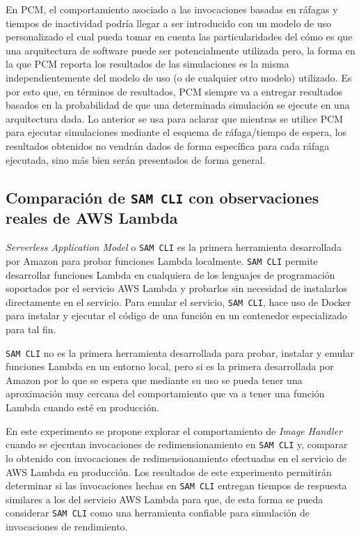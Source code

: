 En PCM, el comportamiento asociado a las invocaciones basadas en ráfagas y tiempos de inactividad podría llegar a ser introducido con un modelo de uso personalizado el cual pueda tomar en cuenta las particularidades del cómo es que una arquitectura de software puede ser potencialmente utilizada pero, la forma en la que PCM reporta los resultados de las simulaciones es la misma independientemente del modelo de uso (o de cualquier otro modelo) utilizado. Es por esto que, en términos de resultados, PCM siempre va a entregar resultados basados en la probabilidad de que una determinada simulación se ejecute en una arquitectura dada. Lo anterior se usa para aclarar que mientras se utilice PCM para ejecutar simulaciones mediante el esquema de ráfaga/tiempo de espera, los resultados obtenidos no vendrán dados de forma específica para cada ráfaga ejecutada, sino más bien serán presentados de forma general.

\subsection{Comparación de \texttt{SAM CLI} con observaciones reales de AWS Lambda}\label{sec:experimento-4} 
\emph{Serverless Application Model} o \texttt{SAM CLI} es la primera herramienta desarrollada por Amazon para probar funciones Lambda localmente. \texttt{SAM CLI} permite desarrollar funciones Lambda en cualquiera de los lenguajes de programación soportados por el servicio AWS Lambda y probarlos sin necesidad de instalarlos directamente en el servicio. Para emular el servicio, \texttt{SAM CLI}, hace uso de Docker para instalar y ejecutar el código de una función en un contenedor especializado para tal fin. 

\texttt{SAM CLI} no es la primera herramienta desarrollada para probar, instalar y emular funciones Lambda en un entorno local, pero si es la primera desarrollada por Amazon por lo que se espera que mediante su uso se pueda tener una aproximación muy cercana del comportamiento que va a tener una función Lambda cuando esté en producción.

En este experimento se propone explorar el comportamiento de \emph{Image Handler} cuando se ejecutan invocaciones de redimensionamiento en \texttt{SAM CLI} y, comparar lo obtenido con invocaciones de redimensionamiento efectuadas en el servicio de AWS Lambda en producción. Los resultados de este experimento permitirán determinar si las invocaciones hechas en \texttt{SAM CLI} entregan tiempos de respuesta similares a los del servicio AWS Lambda para que, de esta forma se pueda considerar \texttt{SAM CLI} como una herramienta confiable para simulación de invocaciones de rendimiento.

